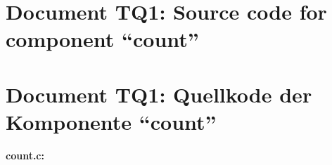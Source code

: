 \pagestyle{myheadings}
\ifenglish
{}
\fi
\ifgerman
{}
\fi
{}
\parindent0pt

\ifenglish
\section*{Document TQ1: Source code for component ``count''}
\fi
\ifgerman
\section*{Document TQ1: Quellkode der Komponente "`count"'}
\fi

{\bf count.c:}
\smallskip



